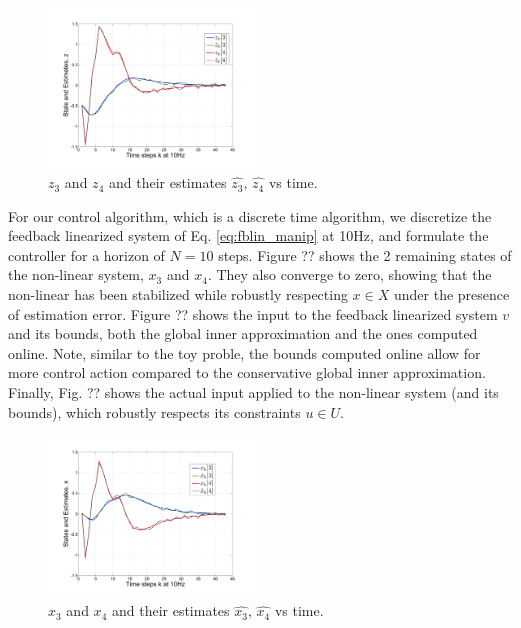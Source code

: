 \begin{figure}
\includegraphics[width=0.49\textwidth]{figs/z_3n4_manip.pdf}
\caption{$z_3$ and $z_4$ and their estimates $\hat{z_3}, \, \hat{z_4}$ vs time. }
\label{fig:z_34}
\end{figure}

For our control algorithm, which is a discrete time algorithm, we discretize the feedback linearized system of Eq. \ref{eq:fblin_manip} at 10Hz, and formulate the controller for a horizon of $N=10$ steps.
Figure ?? shows the 2 remaining states of the non-linear system, $x_3$ and $x_4$. They also converge to zero, showing that the non-linear has been stabilized while robustly respecting $x\in X$ under the presence of estimation error. Figure ?? shows the input to the feedback linearized system $v$ and its bounds, both the global inner approximation and the ones computed online. Note, similar to the toy proble, the bounds computed online allow for more control action compared to the conservative global inner approximation. Finally, Fig. ?? shows the actual input applied to the non-linear system (and its bounds), which robustly respects its constraints $u \in U$.

\begin{figure}
\includegraphics[width=0.49\textwidth]{figs/x_3n4_manip.pdf}
\caption{$x_3$ and $x_4$ and their estimates $\hat{x_3}, \, \hat{x_4}$ vs time. }
\label{fig:x_34}
\end{figure}

